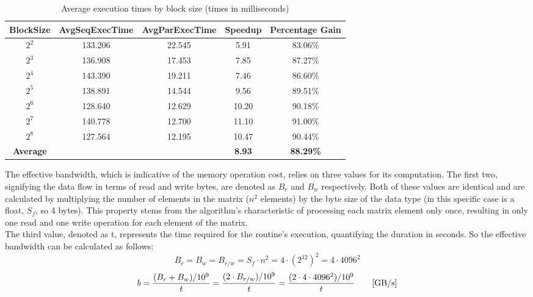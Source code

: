 \documentclass{article}
\begin{document}
\begin{table}[h!tb]
    \centering
    \caption{Average execution times by block size (times in milliseconds)}
    \begin{tabular}{@{} c c c c c @{}}
    \toprule
        \textbf{BlockSize} & \textbf{AvgSeqExecTime} & \textbf{AvgParExecTime} & \textbf{Speedup} & \textbf{Percentage Gain}\\
        \midrule
        $2^2$ & 133.206 & 22.545 & 5.91 & 83.06\%\\
    \lightrule
        $2^3$ & 136.908 & 17.453 & 7.85 & 87.27\%\\
    \lightrule
        $2^4$ & 143.390 & 19.211 & 7.46 & 86.60\%\\
    \lightrule
        $2^5$ & 138.891 & 14.544 & 9.56 & 89.51\%\\
    \lightrule
        $2^6$ & 128.640 & 12.629 & 10.20 & 90.18\%\\
    \lightrule
        $2^7$ & 140.778 & 12.700 & 11.10 & 91.00\%\\
    \lightrule
        $2^8$ & 127.564 & 12.195 & 10.47 & 90.44\%\\
    \midrule
        \textbf{Average} & & & \textbf{8.93} & \textbf{88.29\%}\\
    \bottomrule
    \end{tabular}
    \end{table}

The effective bandwidth, which is indicative of the memory operation cost, relies on three values for its computation. %
The first two, signifying the data flow in terms of read and write bytes, are denoted as $B_r$ and $B_w$ respectively. %
Both of these values are identical and are calculated by multiplying the number of elements in the matrix ($n^2$ elements) by the byte size of the data type (in this specific case is a float, $S_f$, so 4 bytes).
This property stems from the algorithm's characteristic of processing each matrix element only once, resulting in only one read and one write operation for each element of the matrix.\\
The third value, denoted as t, represents the time required for the routine's execution, quantifying the duration in seconds. So the effective bandwidth can be calculated as follows:
\begin{equation}
    B_r = B_w = B_{r/w} = S_f \cdot n^2 = 4 \cdot (2^{12})^2 = 4 \cdot 4096^2
\end{equation}
\begin{equation}
    b=\frac{(B_r+B_w)/10^9}{t}=\frac{(2 \cdot B_{r/w})/10^9}{t}=\frac{(2 \cdot 4 \cdot 4096^2)/10^9}{t}\qquad[\textnormal{GB/s}]
\end{equation}
\end{document}
